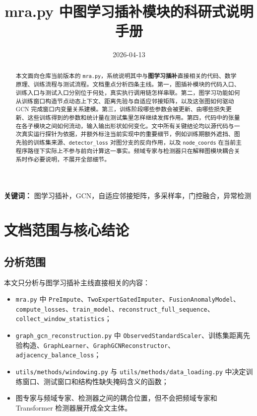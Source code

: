 \documentclass[UTF8]{ctexart}
\title{mra.py 中图学习插补模块的科研式说明手册}
\author{}
\date{2026-04-13}
\begin{document}
\maketitle

\begin{abstract}
本文面向仓库当前版本的 \texttt{mra.py}，系统说明其中与\textbf{图学习插补}直接相关的代码、数学原理、训练流程与测试流程。文档重点分析四条主线。第一，图插补模块的代码入口、训练入口与测试入口分别位于何处，真实执行调用链怎样串联。第二，图学习功能如何从训练窗口构造节点动态上下文、距离先验与自适应邻接矩阵，以及这张图如何驱动 GCN 完成窗口内变量关系建模。第三，训练阶段哪些参数会被更新、由哪些损失更新、这些训练得到的参数和统计量在测试集里怎样继续发挥作用。第四，代码中的张量在各子模块之间如何流动，输入输出形状如何变化。文中所有关键结论均以源代码与一次真实运行探针为依据，并额外标注当前实现中的重要细节，例如训练期额外遮挡、图先验的训练集来源、\texttt{detector\_loss} 对图分支的反向作用，以及 \texttt{node\_coords} 在当前主程序路径下实际上不参与前向计算这一事实。频域专家与检测器只在解释图模块耦合关系时作必要说明，不展开全部细节。
\end{abstract}

\noindent\textbf{关键词：} 图学习插补，GCN，自适应邻接矩阵，多采样率，门控融合，异常检测

\tableofcontents
\newpage

\section{文档范围与核心结论}

\subsection{分析范围}

本文只分析与图学习插补主线直接相关的内容：
\begin{itemize}
    \item \texttt{mra.py} 中 \texttt{PreImpute}、\texttt{TwoExpertGatedImputer}、\texttt{FusionAnomalyModel}、\texttt{compute\_losses}、\texttt{train\_model}、\texttt{reconstruct\_full\_sequence}、\texttt{collect\_window\_statistics}；
    \item \texttt{graph\_gcn\_reconstruction.py} 中 \texttt{ObservedStandardScaler}、训练集距离先验构造、\texttt{GraphLearner}、\texttt{GraphGCNReconstructor}、\texttt{adjacency\_balance\_loss}；
    \item \texttt{utils/methods/windowing.py} 与 \texttt{utils/methods/data\_loading.py} 中决定训练窗口、测试窗口和结构性缺失掩码含义的函数；
    \item 图专家与频域专家、检测器之间的耦合位置，但不会把频域专家和 Transformer 检测器展开成全文主体。
\end{itemize}
\end{document}
